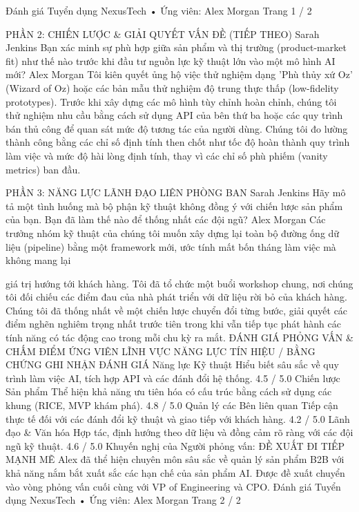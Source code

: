 Đánh giá Tuyển dụng NexusTech • Ứng viên: Alex Morgan
Trang 1 / 2

PHẦN 2: CHIẾN LƯỢC & GIẢI QUYẾT VẤN ĐỀ (TIẾP THEO)
Sarah Jenkins
Bạn xác minh sự phù hợp giữa sản phẩm và thị trường (product-market fit) như thế nào trước khi đầu tư nguồn lực kỹ thuật lớn vào một mô hình AI mới?
Alex Morgan
Tôi kiên quyết ủng hộ việc thử nghiệm dạng 'Phù thủy xứ Oz' (Wizard of Oz) hoặc các bản mẫu thử nghiệm độ trung thực thấp (low-fidelity prototypes). Trước khi xây dựng các mô hình tùy chỉnh hoàn chỉnh, chúng tôi thử nghiệm nhu cầu bằng cách sử dụng API của bên thứ ba hoặc các quy trình bán thủ công để quan sát mức độ tương tác của người dùng. Chúng tôi đo lường thành công bằng các chỉ số định tính then chốt như tốc độ hoàn thành quy trình làm việc và mức độ hài lòng định tính, thay vì các chỉ số phù phiếm (vanity metrics) ban đầu.

PHẦN 3: NĂNG LỰC LÃNH ĐẠO LIÊN PHÒNG BAN
Sarah Jenkins
Hãy mô tả một tình huống mà bộ phận kỹ thuật không đồng ý với chiến lược sản phẩm của bạn. Bạn đã làm thế nào để thống nhất các đội ngũ?
Alex Morgan
Các trưởng nhóm kỹ thuật của chúng tôi muốn xây dựng lại toàn bộ đường ống dữ liệu (pipeline) bằng một framework mới, ước tính mất bốn tháng làm việc mà không mang lại

giá trị hướng tới khách hàng. Tôi đã tổ chức một buổi workshop chung, nơi chúng tôi đối chiếu các điểm đau của nhà phát triển với dữ liệu rời bỏ của khách hàng. Chúng tôi đã thống nhất về một chiến lược chuyển đổi từng bước, giải quyết các điểm nghẽn nghiêm trọng nhất trước tiên trong khi vẫn tiếp tục phát hành các tính năng có tác động cao trong mỗi chu kỳ ra mắt.
ĐÁNH GIÁ PHỎNG VẤN \& CHẤM ĐIỂM ỨNG VIÊN
LĨNH VỰC NĂNG LỰC
TÍN HIỆU / BẰNG CHỨNG GHI NHẬN
ĐÁNH GIÁ
Năng lực Kỹ thuật
Hiểu biết sâu sắc về quy trình làm việc AI, tích hợp API và các đánh đổi hệ thống.
4.5 /
5.0
Chiến lược Sản phẩm
Thể hiện khả năng ưu tiên hóa có cấu trúc bằng cách sử dụng các khung (RICE, MVP khám phá).
4.8 /
5.0
Quản lý các Bên liên quan
Tiếp cận thực tế đối với các đánh đổi kỹ thuật và giao tiếp với khách hàng.
4.2 /
5.0
Lãnh đạo \& Văn hóa
Hợp tác, định hướng theo dữ liệu và đồng cảm rõ ràng với các đội ngũ kỹ thuật.
4.6 /
5.0
Khuyến nghị của Người phỏng vấn: ĐỀ XUẤT ĐI TIẾP MẠNH MẼ
Alex đã thể hiện chuyên môn sâu sắc về quản lý sản phẩm B2B với khả năng nắm bắt xuất sắc các hạn chế của sản phẩm AI. Được đề xuất chuyển vào vòng phỏng vấn cuối cùng với VP of Engineering và CPO.
Đánh giá Tuyển dụng NexusTech • Ứng viên: Alex Morgan
Trang 2 / 2
